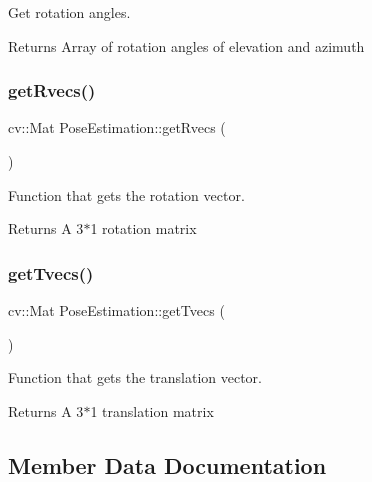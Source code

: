 Get rotation angles. 

\begin{DoxyReturn}{Returns}
Array of rotation angles of elevation and azimuth 
\end{DoxyReturn}
\mbox{\label{class_pose_estimation_a7623a2e105e03b2994654b17a41b12ea}} 
\subsubsection{\texorpdfstring{get\+Rvecs()}{getRvecs()}}
{\footnotesize\ttfamily cv\+::\+Mat Pose\+Estimation\+::get\+Rvecs (\begin{DoxyParamCaption}{ }\end{DoxyParamCaption})}



Function that gets the rotation vector. 

\begin{DoxyReturn}{Returns}
A 3$\ast$1 rotation matrix 
\end{DoxyReturn}
\mbox{\label{class_pose_estimation_a2b02f885606ca11898a5aa3f6bf04b31}} 
\subsubsection{\texorpdfstring{get\+Tvecs()}{getTvecs()}}
{\footnotesize\ttfamily cv\+::\+Mat Pose\+Estimation\+::get\+Tvecs (\begin{DoxyParamCaption}{ }\end{DoxyParamCaption})}



Function that gets the translation vector. 

\begin{DoxyReturn}{Returns}
A 3$\ast$1 translation matrix 
\end{DoxyReturn}


\subsection{Member Data Documentation}
\mbox{\label{class_pose_estimation_a2cfe879dc7fe7841709b3e22d306f7c0}} 
